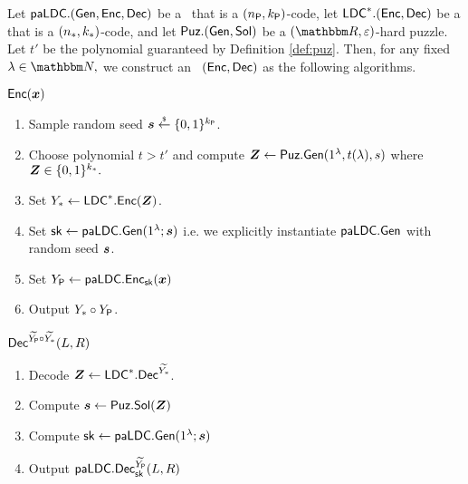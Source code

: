 \begin{construction}\label{constr:resourcePaLDC}
Let $\mathsf{paLDC}.(\mathsf{Gen},\mathsf{Enc},\mathsf{Dec})$ be a \paLDC\ that is a $(n_{\mathsf{P}},k_{\mathsf{P}})$-code, let $\mathsf{LDC}^*.(\mathsf{Enc},\mathsf{Dec})$ be a \LDCStar that is a $(n_{\mathsf{*}},k_{\mathsf{*}})$-code, and let $\mathsf{Puz}.(\mathsf{Gen},\mathsf{Sol})$ be a  $(\R,\eps)$-hard puzzle.
Let $t'$ be the polynomial guaranteed by Definition \ref{def:puz}.
Then, for any fixed $\lambda \in \N,$ we construct an \aLDC\ $(\mathsf{Enc},\mathsf{Dec})$ as the following algorithms.
    \begin{weirdFrame}{$\mathsf{Enc}({\boldsymbol{x}})$}
        \begin{enumerate}
            \item Sample random seed $\boldsymbol{s} \overset{{\scriptscriptstyle\$}}{\leftarrow} \{0,1\}^{k_{\mathsf{P}}}$.
            \item Choose polynomial $t > t'$ and compute $\boldsymbol{Z} \leftarrow \mathsf{Puz}.\mathsf{Gen}(1^\lambda,t(\lambda),s)$ where $\boldsymbol{Z} \in \{0,1\}^{k_{\mathsf{*}}}.$
            \item Set $Y_{*} \leftarrow \mathsf{LDC}^*.\mathsf{Enc}(\boldsymbol{Z})$.
            \item Set $\mathsf{sk} \leftarrow \mathsf{paLDC}.\mathsf{Gen}(1^\lambda;\boldsymbol{s})$ i.e. we explicitly instantiate $\mathsf{paLDC}.\mathsf{Gen}$ with random seed $\boldsymbol{s}$.
            \item Set $Y_{\mathsf{P}} \leftarrow \mathsf{paLDC}.\mathsf{Enc}_{\mathsf{sk}}({\boldsymbol{x}})$
            \item Output $Y_{*} \circ Y_{\mathsf{P}}$.
        \end{enumerate}
    \end{weirdFrame}   

        \begin{weirdFrame}{$\mathsf{Dec}^{\widetilde{Y_{\mathsf{P}}} \circ \widetilde{Y_{*}}}(L,R)$}
        \begin{enumerate}
            \item Decode $\boldsymbol{Z} \leftarrow \mathsf{LDC}^*.\mathsf{Dec}^{\widetilde{Y_{*}}}$.
            \item Compute $\boldsymbol{s} \leftarrow \mathsf{Puz}.\mathsf{Sol}(\boldsymbol{Z})$
            \item Compute $\mathsf{sk} \leftarrow \mathsf{paLDC}.\mathsf{Gen}(1^\lambda;\boldsymbol{s})$
            \item Output $\mathsf{paLDC}.\mathsf{Dec}^{\widetilde{Y_{\mathsf{P}}}}_{\mathsf{sk}}(L,R)$
        \end{enumerate}
    \end{weirdFrame}    
\end{construction}